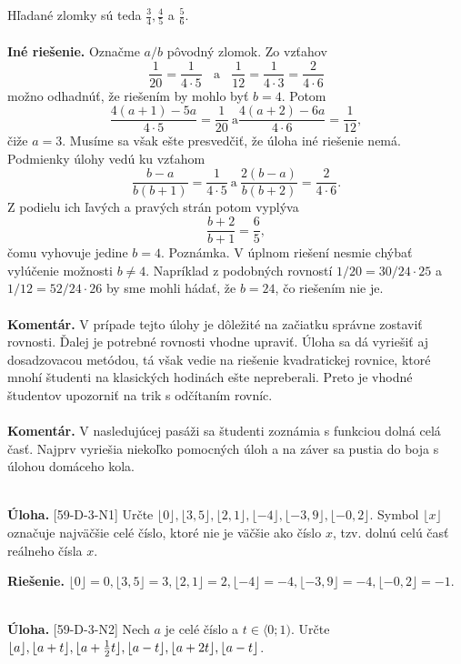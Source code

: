 \documentclass[11pt,a4paper,oneside,final]{book}
\newcommand{\kom}{\textbf{Komentár.} }
\newcommand{\ul}{\textbf{Úloha.} }
\newcommand{\rie}{\textbf{Riešenie.} }
\begin{document}
Hľadané zlomky sú teda $\frac{3}{4}, \frac{4}{5}$ a $\frac{5}{6}$.\\
\\
\textbf{Iné riešenie.} Označme $a/b$ pôvodný zlomok. Zo vzťahov
$$\frac{1}{20}=\frac{1}{4\cdot5} \ \ \ \ \textrm{a} \ \ \ \  \frac{1}{12}=\frac{1}{4\cdot 3}=\frac{2}{4 \cdot 6} $$
možno odhadnúť, že riešením by mohlo byť $b = 4$. Potom
$$ \frac{4(a + 1) - 5a}{4\cdot 5}= \frac{1}{20} \ \textrm{a} \frac{4(a + 2) - 6a}{4\cdot 6}=\frac{1}{12},$$
čiže $a = 3$. Musíme sa však ešte presvedčiť, že úloha iné riešenie nemá. Podmienky úlohy vedú ku vzťahom
$$\frac{b-a}{b(b + 1)}=\frac{1}{4\cdot 5} \ \textrm{a} \ \frac{2(b-a)}{b(b+2)}=\frac{2}{4\cdot 6}.$$
Z podielu ich ľavých a pravých strán potom vyplýva
$$ \frac{b+2}{b+1}=\frac{6}{5},$$ čomu vyhovuje jedine $b = 4$.
Poznámka. V úplnom riešení nesmie chýbať vylúčenie možnosti $b\neq 4$. Napríklad z podobných rovností $1/20 = 30/24 \cdot 25$ a $1/12 = 52/24 \cdot 26$ by sme mohli hádať, že $b = 24$, čo riešením nie je.\\
\\
\kom V prípade tejto úlohy je dôležité na začiatku správne zostaviť rovnosti. Ďalej je potrebné rovnosti vhodne upraviť. Úloha sa dá vyriešiť aj dosadzovacou metódou, tá však vedie na riešenie kvadratickej rovnice, ktoré mnohí študenti na klasických hodinách ešte nepreberali. Preto je vhodné študentov upozorniť na trik s odčítaním rovníc.\\
\\
\kom V nasledujúcej pasáži sa študenti zoznámia s funkciou dolná celá časť. Najprv vyriešia niekoľko pomocných úloh a na záver sa pustia do boja s úlohou domáceho kola.\\
\\
\begin{tcolorbox}[breakable,notitle,boxrule=0pt,colback=light-gray,colframe=light-gray]\ul [59-D-3-N1] Určte $\lfloor 0 \rfloor, \lfloor 3,5 \rfloor,\lfloor 2,1\rfloor, \lfloor -4 \rfloor, \lfloor -3,9 \rfloor, \lfloor -0,2\rfloor$. Symbol $\lfloor x\rfloor$ označuje najväčšie celé číslo, ktoré nie je väčšie ako číslo $x$, tzv. dolnú celú časť reálneho čísla $x$.

\end{tcolorbox}

\rie $\lfloor 0 \rfloor = 0, \lfloor 3,5 \rfloor = 3,\lfloor 2,1\rfloor =2, \lfloor -4 \rfloor = -4, \lfloor -3,9 \rfloor =-4, \lfloor -0,2\rfloor =-1.$\\
\\
\begin{tcolorbox}[breakable,notitle,boxrule=0pt,colback=light-gray,colframe=light-gray]\ul [59-D-3-N2] Nech $a$ je celé číslo a $t \in \langle 0; 1)$. Určte $\lfloor a \rfloor, \lfloor a+t \rfloor,\lfloor a+\frac{1}{2}t\rfloor, \lfloor a-t \rfloor, \\ \lfloor a+2t \rfloor, \lfloor a-t\rfloor$.

\end{tcolorbox}
\end{document}
